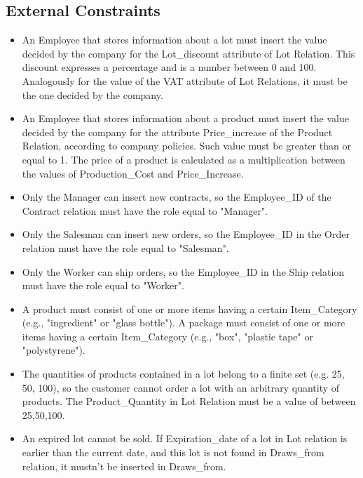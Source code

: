 \subsection{External Constraints}
\begin{itemize}
\item An Employee that stores information about a lot must insert the value decided by the company for the Lot\_discount attribute of Lot Relation. This discount expresses a percentage and is a number between 0 and 100. Analogously for the value of the VAT attribute of Lot Relations, it must be the one decided by the company.
\item An Employee that stores information about a product must insert the value decided by the company for the attribute Price\_increase of the Product Relation, according to company policies. Such value must be greater than or equal to 1. The price of a product is calculated as a multiplication between the values of Production\_Cost and Price\_Increase.
\item Only the Manager can insert new contracts, so the Employee\_ID of the Contract relation must have the role equal to "Manager". 
\item Only the Salesman can insert new orders, so the Employee\_ID in the Order relation must have the role equal to "Salesman". 
\item Only the Worker can ship orders, so the Employee\_ID in the Ship relation must have the role equal to "Worker".
\item A product must consist of one or more items having a certain Item\_Category (e.g., "ingredient" or "glass bottle"). A package must consist of one or more items having a certain Item\_Category (e.g., "box", "plastic tape" or "polystyrene"). 
\item The quantities of products contained in a lot belong to a finite set (e.g. 25, 50, 100), so the customer cannot order a lot with an arbitrary quantity of products. The Product\_Quantity in Lot Relation must be a value of between 25,50,100.
\item An expired lot cannot be sold. If Expiration\_date of a lot in  Lot relation is earlier than the current date, and this lot is not found in Draws\_from relation, it mustn't be  inserted in Draws\_from.
\end{itemize}